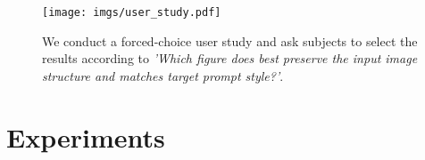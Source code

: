 \documentclass[twocolumn]{svjour3}          \smartqed  \usepackage{graphicx}
\begin{document}
\begin{table}[t]
    \setlength{\tabcolsep}{1mm}
\caption{\small Comparison with baselines on three metrics. NS-LPIPS: non-selected LPIPS.  *DDIM: DDIM inversion with word swap.  Although \textit{DDIM with word swap} achieves the best Clipscore, it not only changes the background, but also modifies the structure of the selected region, see also Fig.~\ref{fig:cat2dog} (last three rows, fourth column).
}\label{tab:scores}
\end{table}


\begin{table}[t]
    \setlength{\tabcolsep}{1mm}
\caption{We report the inference time of each timestep and PSNR/SSIM. We have better reconstruction quality with a small computational overhead. 
}\label{tab:infer_time}
\end{table}

\begin{figure}[t]
\centering
\texttt{[image: imgs/user\_study.pdf]}
        \caption{ We conduct a forced-choice user study and ask subjects to select the results according to \textit{'Which figure does best preserve the input image structure and matches target prompt style?'}.}
    \label{fig:user_study}
\end{figure}

\section{Experiments}
\end{document}
